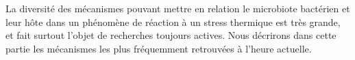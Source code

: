 La diversité des mécanismes pouvant mettre en relation le microbiote bactérien
et leur hôte dans un phénomène de réaction à un stress thermique est très
grande, et fait surtout l'objet de recherches toujours actives. Nous décrirons
dans cette partie les mécanismes les plus fréquemment retrouvées à l'heure
actuelle.
